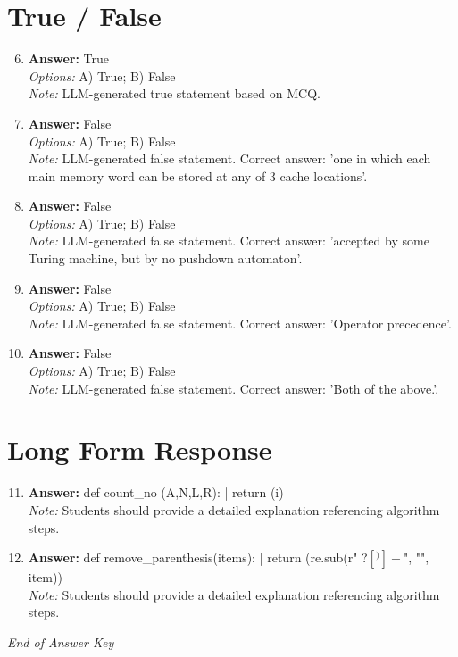 \documentclass[12pt]{article}
\begin{document}
\section*{True / False}
\begin{enumerate}[label=\arabic*.]
\setcounter{enumi}{5}
\item \textbf{Answer:} True
\\ \textit{Options:} A) True; B) False
\\ \textit{Note:} LLM-generated true statement based on MCQ.
\item \textbf{Answer:} False
\\ \textit{Options:} A) True; B) False
\\ \textit{Note:} LLM-generated false statement. Correct answer: 'one in which each main memory word can be stored at any of 3 cache locations'.
\item \textbf{Answer:} False
\\ \textit{Options:} A) True; B) False
\\ \textit{Note:} LLM-generated false statement. Correct answer: 'accepted by some Turing machine, but by no pushdown automaton'.
\item \textbf{Answer:} False
\\ \textit{Options:} A) True; B) False
\\ \textit{Note:} LLM-generated false statement. Correct answer: 'Operator precedence'.
\item \textbf{Answer:} False
\\ \textit{Options:} A) True; B) False
\\ \textit{Note:} LLM-generated false statement. Correct answer: 'Both of the above.'.
\end{enumerate}

\section*{Long Form Response}
\begin{enumerate}[label=\arabic*.]
\setcounter{enumi}{10}
\item \textbf{Answer:} def count\_no (A,N,L,R): | return (i)
\\ \textit{Note:} Students should provide a detailed explanation referencing algorithm steps.
\item \textbf{Answer:} def remove\_parenthesis(items): | return (re.sub(r" ?\([^)]+\)", "", item))
\\ \textit{Note:} Students should provide a detailed explanation referencing algorithm steps.
\end{enumerate}

\vfill
\noindent\textit{End of Answer Key}
\end{document}
